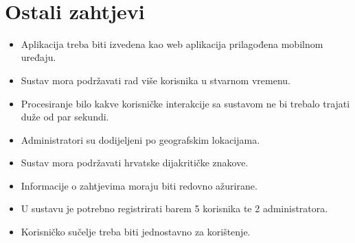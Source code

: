 				\
				\eject
	
		\section{Ostali zahtjevi}
		
		\begin{itemize}
			\item Aplikacija treba biti izvedena kao web aplikacija prilagođena mobilnom uređaju.
			\item Sustav mora podržavati rad više korisnika u stvarnom vremenu.
			\item Procesiranje bilo kakve korisničke interakcije sa sustavom ne bi trebalo trajati duže od par sekundi.
			\item Administratori su dodijeljeni po geografskim lokacijama.
			\item Sustav mora podržavati hrvatske dijakritičke znakove.
			\item Informacije o zahtjevima moraju biti redovno ažurirane.
			\item U sustavu je potrebno registrirati barem 5 korisnika te 2 administratora.
			\item Korisničko sučelje treba biti jednostavno za korištenje.
		\end{itemize}
			 
			 
			 
	